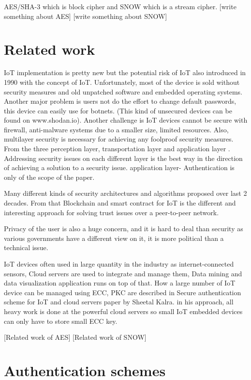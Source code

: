 \documentclass[preprint,10pt,5p]{elsarticle}
\begin{document}
AES/SHA-3  which is block cipher and SNOW which is a stream cipher. [write something about AES] [write something about SNOW]

\section{Related work}
IoT implementation is pretty new but the potential risk of IoT also introduced in 1990 with the concept of IoT.\cite{7165580} Unfortunately, most of the device is sold without security measures and old unpatched software and embedded operating systems. Another major problem is users not do the effort to change default passwords,  this device can easily use for botnets. (This kind of unsecured devices can be found on www.shodan.io). Another challenge is IoT devices cannot be secure with firewall, anti-malware systems due to a smaller size, limited resources. Also, multilayer security is necessary for achieving any foolproof security measures. From the three perception layer, transportation layer and application layer \cite{Yang2012}. 
Addressing security issues on each different layer is the best way in the direction of achieving a solution to a security issue. \cite{Jing2014} application layer- Authentication is only of the scope of the paper.  

Many different kinds of security architectures and algorithms proposed over last 2 decades. From that Blockchain and smart contract for IoT is the different and interesting approach for solving trust issues over a peer-to-peer network.\cite{christidis2016blockchains}

Privacy of the user is also a huge concern, and it is hard to deal than security as various governments have a different view on it, it is more political than a technical issue.\cite{Weber2010}

IoT devices often used in large quantity in the industry as internet-connected sensors, Cloud servers are used to integrate and manage them, Data mining and data visualization application runs on top of that.  How a large number of IoT device can be managed using ECC, PKC are described in Secure authentication scheme for IoT and cloud servers paper by Sheetal Kalra. in his approach, all heavy work is done at the powerful cloud servers so small IoT embedded devices can only have to store small ECC key. \cite{Kalra2015}

[Related work of AES]
[Related work of SNOW]

\section{Authentication schemes}
\end{document}
